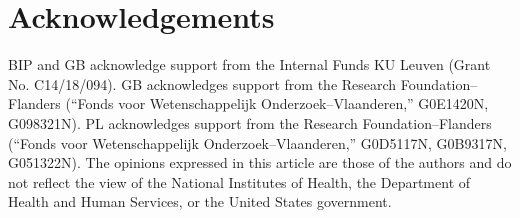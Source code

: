 \section*{Acknowledgements}
BIP and GB acknowledge support from the Internal Funds KU Leuven (Grant No. C14/18/094).
GB acknowledges support from the Research Foundation--Flanders (``Fonds voor Wetenschappelijk Onderzoek--Vlaanderen,'' G0E1420N, G098321N).
PL acknowledges support from the Research Foundation--Flanders (``Fonds voor Wetenschappelijk Onderzoek--Vlaanderen,'' G0D5117N, G0B9317N, G051322N).
The opinions expressed in this article are those of the authors and do not reflect the view of the National Institutes of Health, the Department of Health and Human Services, or the United States government.


\cleardoublepage

